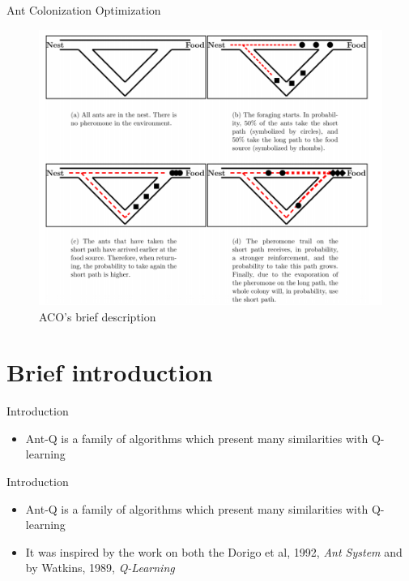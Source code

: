 \documentclass[aspectratio=169,xcolor=dvipsnames]{beamer}
\begin{document}
\begin{frame}{Ant Colonization Optimization}
    \begin{figure}
        \centering
        \includegraphics[scale = 0.40]{ACO description.png}
        \caption{ACO's brief description}
        \label{fig:my_label}
    \end{figure}
\end{frame}

\section{Brief introduction}
\begin{frame}{Introduction}
    \begin{itemize}
        \item Ant-Q is \alert{a family of algorithms} which present many similarities with Q-learning
    \end{itemize}
\end{frame}

\begin{frame}{Introduction}
    \begin{itemize}
        \item Ant-Q is \alert{a family of algorithms} which present many similarities with Q-learning
        \item It was inspired by the work on both the Dorigo et al, 1992, \textit{Ant System} and by Watkins, 1989, \textit{Q-Learning} 
    \end{itemize}
\end{frame}
\end{document}
